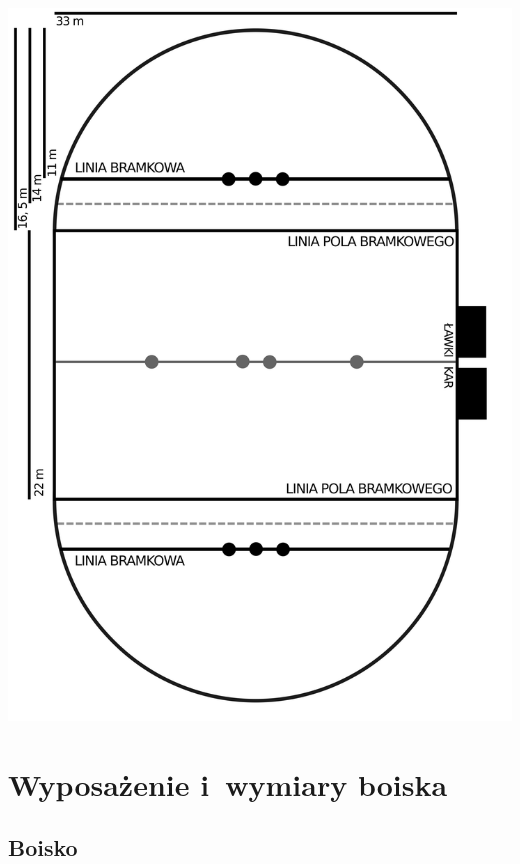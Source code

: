\documentclass[12pt,a4paper]{article}
\begin{document}
\thispagestyle{empty}
\includegraphics[width=0.8\paperwidth]{quidditch_boisko}
\restoregeometry

\pagebreak
\section{Wyposażenie i~wymiary boiska}

\subsection{Boisko}
\end{document}
